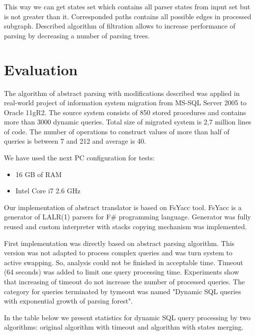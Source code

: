 \documentclass{llncs}
\begin{document}
This way we can get states set which contains all parser states from input set but is not greater than it. Corresponded paths contains all possible edges in processed subgraph. Described algorithm of filtration allows to increase performance of parsing by decreasing a number of parsing trees.

\section{Evaluation}
\label{sec:Evaluation}

The algorithm of abstract parsing with modifications described was applied in real-world project of information system migration from MS-SQL Server 2005 to Oracle 11gR2. The source system consists of 850 stored procedures and contains more than 3000 dynamic queries. Total size of migrated system is 2,7 million lines of code. The number of operations to construct values of more than half of queries is between 7 and 212 and average is 40.

We have used the next PC configuration for tests: 
\begin{itemize}
    \item 16 GB of RAM
    \item Intel Core i7 2.6 GHz
\end{itemize}

Our implementation of abstract translator is based on FsYacc tool. FsYacc is a generator of LALR(1) parsers for F\# programming language. Generator was fully reused and custom interpreter with stacks copying mechanism was implemented. 

First implementation was directly based on abstract parsing algorithm. This version was not adapted to process complex queries and was turn system to active swapping. So, analysis could not be finished in acceptable time. Timeout (64 seconds) was added to limit one query processing time. Experiments show that increasing of timeout do not increase the number of processed queries. The category for queries terminated by tymeout was named "Dynamic SQL queries with exponential growth of parsing forest".

In the table below we present statistics for dynamic SQL query processing by two algorithms: original algorithm with timeout and algorithm with states merging.
\end{document}
